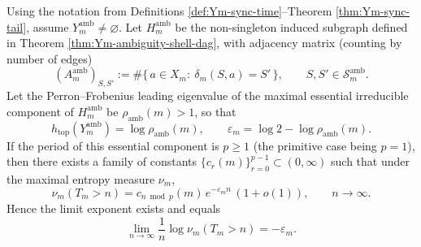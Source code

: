 \begin{theorem}\label{thm:Ym-sync-tail-pf-sharp}
Using the notation from Definitions \ref{def:Ym-sync-time}--Theorem \ref{thm:Ym-sync-tail}, assume \(Y_m^{\mathrm{amb}}\neq\varnothing\).
Let \(H_m^{\mathrm{amb}}\) be the non-singleton induced subgraph defined in Theorem \ref{thm:Ym-ambiguity-shell-dag}, with adjacency matrix (counting by number of edges)
\[
(A_m^{\mathrm{amb}})_{S,S'}:=\#\{\,a\in X_m:\ \delta_m(S,a)=S'\,\},\qquad
S,S'\in\mathcal{S}_m^{\mathrm{amb}}.
\]
Let the Perron--Frobenius leading eigenvalue of the maximal essential irreducible component of \(H_m^{\mathrm{amb}}\) be \(\rho_{\mathrm{amb}}(m)>1\), so that
\[
h_{\mathrm{top}}(Y_m^{\mathrm{amb}})=\log\rho_{\mathrm{amb}}(m),
\qquad
\varepsilon_m=\log 2-\log\rho_{\mathrm{amb}}(m).
\]
If the period of this essential component is \(p\ge 1\) (the primitive case being \(p=1\)), then there exists a family of constants
\(\{c_r(m)\}_{r=0}^{p-1}\subset(0,\infty)\)
such that under the maximal entropy measure \(\nu_m\),
\[
\nu_m(T_m>n)=c_{n\bmod p}(m)\,e^{-\varepsilon_m n}\,(1+o(1)),
\qquad n\to\infty.
\]
Hence the limit exponent exists and equals
\[
\lim_{n\to\infty}\frac{1}{n}\log \nu_m(T_m>n)=-\varepsilon_m.
\]
\end{theorem}

